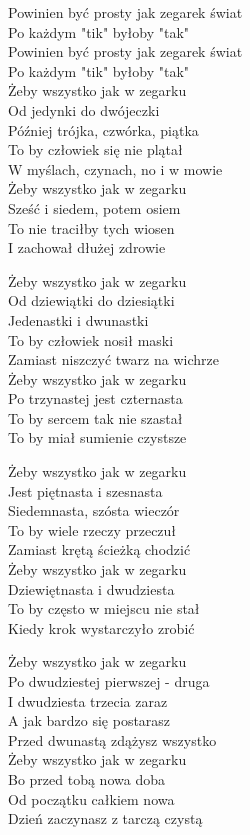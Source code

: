 \begin{text}
    Powinien być prosty jak zegarek świat\\
    Po każdym "tik" byłoby "tak"\\
    Powinien być prosty jak zegarek świat\\
    Po każdym "tik" byłoby "tak"\\

    Żeby wszystko jak w zegarku\\
    Od jedynki do dwójeczki\\
    Później trójka, czwórka, piątka\\
    To by człowiek się nie plątał\\
    W myślach, czynach, no i w mowie\\
    Żeby wszystko jak w zegarku\\
    Sześć i siedem, potem osiem\\
    To nie traciłby tych wiosen\\
    I zachował dłużej zdrowie

    Żeby wszystko jak w zegarku\\
    Od dziewiątki do dziesiątki\\
    Jedenastki i dwunastki\\
    To by człowiek nosił maski\\
    Zamiast niszczyć twarz na wichrze\\
    Żeby wszystko jak w zegarku\\
    Po trzynastej jest czternasta\\
    To by sercem tak nie szastał\\
    To by miał sumienie czystsze

    Żeby wszystko jak w zegarku\\
    Jest piętnasta i szesnasta\\
    Siedemnasta, szósta wieczór\\
    To by wiele rzeczy przeczuł\\
    Zamiast krętą ścieżką chodzić\\
    Żeby wszystko jak w zegarku\\
    Dziewiętnasta i dwudziesta\\
    To by często w miejscu nie stał\\
    Kiedy krok wystarczyło zrobić

    Żeby wszystko jak w zegarku\\
    Po dwudziestej pierwszej - druga\\
    I dwudziesta trzecia zaraz\\
    A jak bardzo się postarasz\\
    Przed dwunastą zdążysz wszystko\\
    Żeby wszystko jak w zegarku\\
    Bo przed tobą nowa doba\\
    Od początku całkiem nowa\\
    Dzień zaczynasz z tarczą czystą
\end{text}
\begin{chord}

\end{chord}